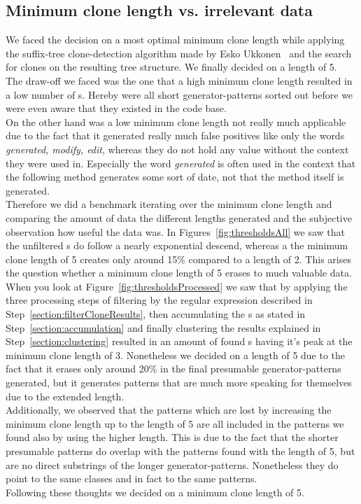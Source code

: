 \subsection{Minimum clone length vs. irrelevant data}
We faced the decision on a most optimal minimum clone length while applying the suffix-tree clone-detection algorithm made by Esko Ukkonen~\cite{Ukkonen1995} and the search for clones on the resulting tree structure. We finally decided on a length of 5. \\
The draw-off we faced was the one that a high minimum clone length resulted in a low number of s. Hereby were all short generator-patterns sorted out before we were even aware that they existed in the code base.\\
On the other hand was a low minimum clone length not really much applicable due to the fact that it generated really much false positives like only the words \textit{generated, modify, edit}, whereas they do not hold any value without the context they were used in. Especially the word \textit{generated} is often used in the context that the following method generates some sort of date, not that the method itself is generated.\\
Therefore we did a benchmark iterating over the minimum clone length and comparing the amount of data the different lengths generated and the subjective observation how useful the data was. In Figures~\ref{fig:thresholdsAll} we saw that the unfiltered s do follow a nearly exponential descend, whereas a the minimum clone length of 5 creates only around 15\% compared to a length of 2. This arises the question whether a minimum clone length of 5 erases to much valuable data.\\
When you look at Figure~\ref{fig:thresholdsProcessed} we saw that by applying the three processing steps of filtering by the regular expression described in Step~\ref{section:filterCloneResults}, then accumulating the s as stated in Step~\ref{section:accumulation} and finally clustering the results explained in Step~\ref{section:clustering} resulted in an amount of found s having it's peak at the minimum clone length of 3. Nonetheless we decided on a length of 5 due to the fact that it erases only around 20\% in the final presumable generator-patterns generated, but it generates patterns that are much more speaking for themselves due to the extended length.\\
Additionally, we observed that the patterns which are lost by increasing the minimum clone length up to the length of 5 are all included in the patterns we found also by using the higher length. This is due to the fact that the shorter presumable patterns do overlap with the patterns found with the length of 5, but are no direct substrings of the longer generator-patterns. Nonetheless they do point to the same classes and in fact to the same patterns.\\
Following these thoughts we decided on a minimum clone length of 5.

